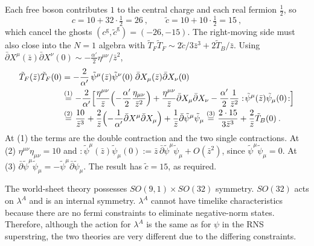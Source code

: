 \begin{tcolorbox}[breakable]
	\begin{remark}
		Each free boson contributes $1$ to the central charge and each real fermion $\frac{1}{2}$, so
		\begin{equation*}
			c=10+32\cdot\tfrac{1}{2}=26\:,\qquad \tilde{c}=10+10\cdot\tfrac{1}{2}=15\:,
		\end{equation*}
		which cancel the ghosts $(c^{\text{g}},\tilde{c}^{\text{g}})=(-26,-15)$. The right-moving side must also close into the $N=1$ algebra with $\tilde{T}_{F}\tilde{T}_{F}\sim 2\tilde{c}/3\bar{z}^{3}+2\tilde{T}_{B}/\bar{z}$. Using $\bar{\partial}X^{\mu}(\bar{z})\bar{\partial}X^{\nu}(0)\sim-\frac{\alpha'}{2}\eta^{\mu\nu}/\bar{z}^{2}$,
		\begin{align*}
			\tilde{T}_{F}(\bar{z})\tilde{T}_{F}(0)&=-\frac{2}{\alpha'}\,\tilde{\psi}^{\mu}(\bar{z})\tilde{\psi}^{\nu}(0)\;\bar{\partial}X_{\mu}(\bar{z})\bar{\partial}X_{\nu}(0)\\
			&\overset{(1)}{=}-\frac{2}{\alpha'}\Bigl[\frac{\eta^{\mu\nu}}{\bar{z}}\Bigl(-\frac{\alpha'}{2}\frac{\eta_{\mu\nu}}{\bar{z}^{2}}\Bigr)
			+\frac{\eta^{\mu\nu}}{\bar{z}}\bar{\partial}X_{\mu}\bar{\partial}X_{\nu}
			-\frac{\alpha'}{2}\frac{1}{\bar{z}^{2}}:\!\tilde{\psi}^{\mu}(\bar{z})\tilde{\psi}_{\mu}(0)\!:\Bigr]\\
			&\overset{(2)}{=}\frac{10}{\bar{z}^{3}}+\frac{2}{\bar{z}}\Bigl(-\frac{1}{\alpha'}\bar{\partial}X^{\mu}\bar{\partial}X_{\mu}\Bigr)+\frac{1}{\bar{z}}\bar{\partial}\tilde{\psi}^{\mu}\tilde{\psi}_{\mu}
			\overset{(3)}{=}\frac{2\cdot 15}{3\bar{z}^{3}}+\frac{2}{\bar{z}}\tilde{T}_{B}(0)\:.
		\end{align*}
		At (1) the terms are the double contraction and the two single contractions. At (2) $\eta^{\mu\nu}\eta_{\mu\nu}=10$ and $:\!\tilde{\psi}^{\mu}(\bar{z})\tilde{\psi}_{\mu}(0)\!:=\bar{z}\,\bar{\partial}\tilde{\psi}^{\mu}\tilde{\psi}_{\mu}+O(\bar{z}^{2})$, since $\tilde{\psi}^{\mu}\tilde{\psi}_{\mu}=0$. At (3) $\bar{\partial}\tilde{\psi}^{\mu}\tilde{\psi}_{\mu}=-\tilde{\psi}^{\mu}\bar{\partial}\tilde{\psi}_{\mu}$. The result has $\tilde{c}=15$, as required.
	\end{remark}
\end{tcolorbox}

The world-sheet theory possesses $SO(9,1)\times SO(32)$ symmetry. $SO(32)$ acts on $\lambda^{A}$ and is an internal symmetry. $\lambda^{A}$ cannot have timelike characteristics because there are no fermi constraints to eliminate negative-norm states. Therefore, although the action for $\lambda^{A}$ is the same as for $\psi$ in the RNS superstring, the two theories are very different due to the differing constraints.

